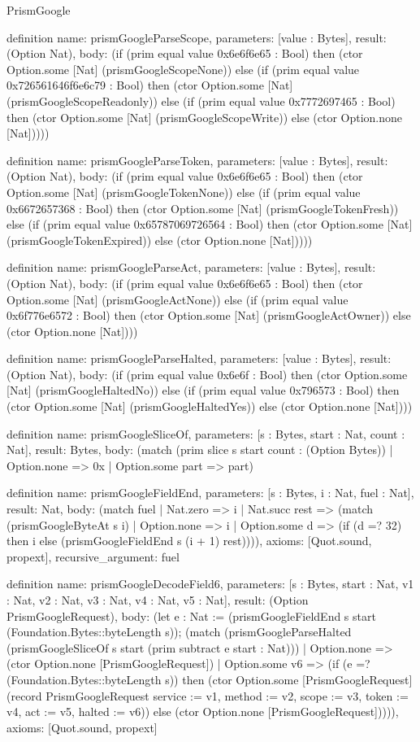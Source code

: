 \begin{lexlean}{PrismGoogle}
\begin{semanticmodule}
definition{
  name: prismGoogleParseScope,
  parameters: [value : Bytes],
  result: (Option Nat),
  body: (if (prim equal value 0x6e6f6e65 : Bool) then (ctor Option.some [Nat] (prismGoogleScopeNone)) else (if (prim equal value 0x726561646f6e6c79 : Bool) then (ctor Option.some [Nat] (prismGoogleScopeReadonly)) else (if (prim equal value 0x7772697465 : Bool) then (ctor Option.some [Nat] (prismGoogleScopeWrite)) else (ctor Option.none [Nat]))))
}

definition{
  name: prismGoogleParseToken,
  parameters: [value : Bytes],
  result: (Option Nat),
  body: (if (prim equal value 0x6e6f6e65 : Bool) then (ctor Option.some [Nat] (prismGoogleTokenNone)) else (if (prim equal value 0x6672657368 : Bool) then (ctor Option.some [Nat] (prismGoogleTokenFresh)) else (if (prim equal value 0x65787069726564 : Bool) then (ctor Option.some [Nat] (prismGoogleTokenExpired)) else (ctor Option.none [Nat]))))
}

definition{
  name: prismGoogleParseAct,
  parameters: [value : Bytes],
  result: (Option Nat),
  body: (if (prim equal value 0x6e6f6e65 : Bool) then (ctor Option.some [Nat] (prismGoogleActNone)) else (if (prim equal value 0x6f776e6572 : Bool) then (ctor Option.some [Nat] (prismGoogleActOwner)) else (ctor Option.none [Nat])))
}

definition{
  name: prismGoogleParseHalted,
  parameters: [value : Bytes],
  result: (Option Nat),
  body: (if (prim equal value 0x6e6f : Bool) then (ctor Option.some [Nat] (prismGoogleHaltedNo)) else (if (prim equal value 0x796573 : Bool) then (ctor Option.some [Nat] (prismGoogleHaltedYes)) else (ctor Option.none [Nat])))
}

definition{
  name: prismGoogleSliceOf,
  parameters: [s : Bytes, start : Nat, count : Nat],
  result: Bytes,
  body: (match (prim slice s start count : (Option Bytes))
    | Option.none => 0x
    | Option.some part => part)
}

definition{
  name: prismGoogleFieldEnd,
  parameters: [s : Bytes, i : Nat, fuel : Nat],
  result: Nat,
  body: (match fuel
    | Nat.zero => i
    | Nat.succ rest => (match (prismGoogleByteAt s i)
      | Option.none => i
      | Option.some d => (if (d =? 32) then i else (prismGoogleFieldEnd s (i + 1) rest)))),
  axioms: [Quot.sound, propext],
  recursive_argument: fuel
}

definition{
  name: prismGoogleDecodeField6,
  parameters: [s : Bytes, start : Nat, v1 : Nat, v2 : Nat, v3 : Nat, v4 : Nat, v5 : Nat],
  result: (Option PrismGoogleRequest),
  body: (let e : Nat := (prismGoogleFieldEnd s start (Foundation.Bytes::byteLength s)); (match (prismGoogleParseHalted (prismGoogleSliceOf s start (prim subtract e start : Nat)))
    | Option.none => (ctor Option.none [PrismGoogleRequest])
    | Option.some v6 => (if (e =? (Foundation.Bytes::byteLength s)) then (ctor Option.some [PrismGoogleRequest] (record PrismGoogleRequest {service := v1, method := v2, scope := v3, token := v4, act := v5, halted := v6})) else (ctor Option.none [PrismGoogleRequest])))),
  axioms: [Quot.sound, propext]
}


\end{semanticmodule}
\end{lexlean}
